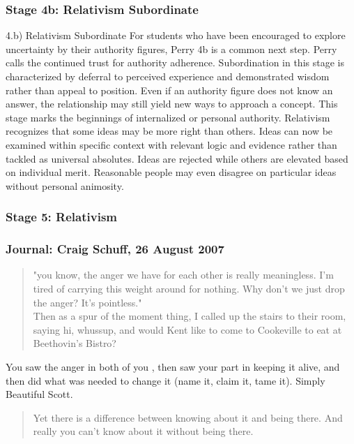 \subsubsection{Stage 4b: Relativism Subordinate}

4.b)  Relativism Subordinate
For students who have been encouraged to explore uncertainty by their authority figures, Perry 4b is a common next step.  Perry calls the continued trust for authority adherence.   Subordination in this stage  is characterized by deferral to perceived experience and demonstrated wisdom rather than appeal to position.  Even if an authority figure does not know an answer, the relationship may still yield new ways to approach a concept.  This stage marks the beginnings of internalized or personal authority.  Relativism recognizes that some ideas may be more right than others.  Ideas can now be examined within specific context with relevant logic and evidence rather than tackled as universal absolutes.  Ideas are rejected while others are elevated based on individual merit.  Reasonable people may even disagree on particular ideas without personal animosity.  

\subsubsection{Stage 5: Relativism}

\subsubsection{Journal: Craig Schuff, 26 August 2007}

	\begin{quote}"you know, the anger we have for each other is really meaningless. I'm
 tired of carrying this weight around for nothing. Why don't we just drop the
 anger? It's pointless." \\
 Then as a spur of the moment thing, I called up the stairs to their room,
 saying hi, whussup, and would Kent like to come to Cookeville to eat at
 Beethovin's Bistro?
	\end{quote}


You saw the anger in both of you , then saw your part in keeping it alive,
and then did what was needed to change it (name it, claim it, tame it).
Simply Beautiful Scott.

	\begin{quote}
		Yet there is a difference between knowing about it and being there. And
		really you can't know about it without being there.
	\end{quote}

